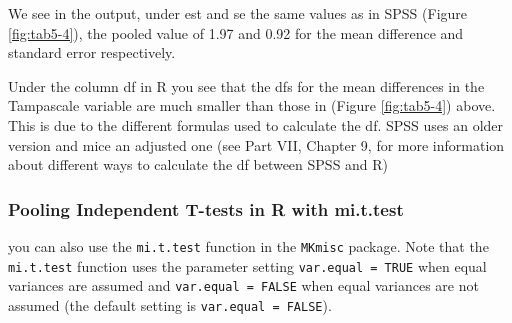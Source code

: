 \documentclass[
]{book}
\begin{document}
We see in the output, under est and se the same values as in SPSS (Figure \ref{fig:tab5-4}), the pooled value of 1.97 and 0.92 for the mean difference and standard error respectively.

Under the column df in R you see that the dfs for the mean differences in the Tampascale variable are much smaller than those in (Figure \ref{fig:tab5-4}) above. This is due to the different formulas used to calculate the df. SPSS uses an older version and mice an adjusted one (see Part VII, Chapter 9, for more information about different ways to calculate the df between SPSS and R)

\hypertarget{pooling-independent-t-tests-in-r-with-mi.t.test}{%
\subsubsection{Pooling Independent T-tests in R with mi.t.test}\label{pooling-independent-t-tests-in-r-with-mi.t.test}}

you can also use the \texttt{mi.t.test} function in the \texttt{MKmisc} package. Note that the \texttt{mi.t.test} function uses the parameter setting \texttt{var.equal\ =\ TRUE} when equal variances are assumed and \texttt{var.equal\ =\ FALSE} when equal variances are not assumed (the default setting is \texttt{var.equal\ =\ FALSE}).
\end{document}
